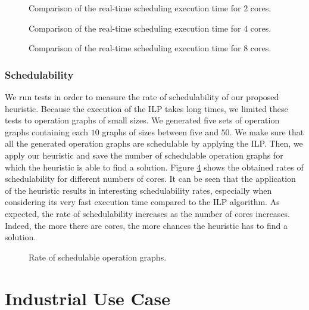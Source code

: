 \begin{figure}[phbt]
\centering

\caption{Comparison of the real-time scheduling execution time for $2$ cores.}
\label{fig:RT_sched_exec_2}
\end{figure}

\begin{figure}[phbt]
\centering

\caption{Comparison of the real-time scheduling execution time for $4$ cores.}
\label{fig:RT_sched_exec_4}
\end{figure}

\begin{figure}[phbt]
\centering

\caption{Comparison of the real-time scheduling execution time for $8$ cores.}
\label{fig:RT_sched_exec_8}
\end{figure}

\subsubsection{Schedulability}
We run tests in order to measure the rate of schedulability of our proposed heuristic. Because the execution of the ILP takes long times, we limited these tests to operation graphs of small sizes. We generated five sets of operation graphs containing each $10$ graphs of sizes between five and $50$. We make sure that all the generated operation graphs are schedulable by applying the ILP. Then, we apply our heuristic and save the number of schedulable operation graphs for which the heuristic is able to find a solution. Figure \ref{fig:scehdrate} shows the obtained rates of schedulability for different numbers of cores. It can be seen that the application of the heuristic results in interesting  schedulability rates, especially when considering its very fast execution time compared to the ILP algorithm. 
As expected, the rate of schedulability increases as the number of cores increases. Indeed, the more there are cores, the more chances the heuristic has to find a solution. 

\begin{figure}[phbt]
\centering

\caption{Rate of schedulable operation graphs.}
\label{fig:scehdrate}
\end{figure} 

\section{Industrial Use Case} 

